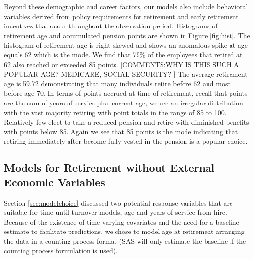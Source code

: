 \documentclass[12pt,letterpaper]{article}
\begin{document}
Beyond these demographic and career factors, our models also include behavioral variables derived from policy requirements for retirement and early retirement incentives that occur throughout the observation period. Histograms of retirement age and accumulated pension points are shown in Figure \ref{fig:hist}. The histogram of retirement age is right skewed and shows an anomalous spike at age equals 62 which is the mode.  We find that 79\% of the employees that retired at 62 also reached or exceeded 85 points.
[COMMENTS:WHY IS THIS SUCH A POPULAR AGE?  MEDICARE, SOCIAL SECURITY? ]
The average retirement age is 59.72 demonstrating that many individuals retire before 62 and most before age 70. In terms of points accrued at time of retirement, recall that points are the sum of years of service plus current age, we see an irregular distribution with the vast majority retiring with point totals in the range of 85 to 100. Relatively few elect to take a reduced pension and retire with diminished benefits with points below 85. Again we see that 85 points is the mode indicating that retiring immediately after become fully vested in the pension is a popular choice.

\subsection{Models for Retirement without External Economic Variables}
Section \ref{sec:modelchoice} discussed two potential response variables that are suitable for time until turnover models, age and years of service from hire.  Because of the existence of time varying covariates and the need for a baseline estimate to facilitate predictions, we chose to model age at retirement arranging the data in a counting process format (SAS will only estimate the baseline if the counting process formulation is used).



\end{document}
